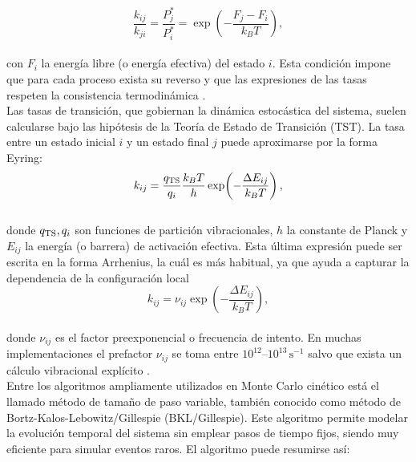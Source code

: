 \documentclass[12pt,letterpaper,oneside]{report}
\begin{document}
\begin{equation}
\frac{k_{ij}}{k_{ji}} = \frac{P_j^\ast}{P_i^\ast} = \exp\!\left(-\frac{F_j - F_i}{k_B T}\right),
\label{eq:detailed_balance}
\end{equation}\\

\noindent con \(F_i\) la energía libre (o energía efectiva) del estado \(i\). Esta condición impone que para cada proceso exista su reverso y que las expresiones de las tasas respeten la consistencia termodinámica \cite{Andersen2019}. \\

Las tasas de transición, que gobiernan la dinámica estocástica del sistema, suelen calcularse bajo las hipótesis de la Teoría de Estado de Transición (TST). La tasa entre un estado inicial \(i\) y un estado final \(j\) puede aproximarse por la forma Eyring:\\

\begin{equation}
k_{ij} = \frac{q_{\rm TS}}{q_i}\frac{k_B T}{h}\exp\!\left(-\frac{\Delta E_{ij}}{k_B T}\right),
\label{eq:tst}
\end{equation}\\

\noindent donde \(q_{\rm TS}, q_i\) son funciones de partición vibracionales, \(h\) la constante de Planck y $E_{ij}$ la energía (o barrera) de activación efectiva. Esta última expresión puede ser escrita en la forma Arrhenius, la cuál es más habitual, ya que ayuda a capturar la dependencia de la configuración local\\

\begin{equation}
k_{ij} =  \nu_{ij}\exp\!\left(-\frac{\Delta E_{ij}}{k_B T}\right),
\label{eq:Arr}
\end{equation}\\

\noindent donde $\nu_{ij}$ es el factor preexponencial o frecuencia de intento. En muchas implementaciones el prefactor \(\nu_{ij}\) se toma entre \(10^{12}\)–\(10^{13}\,\text{s}^{-1}\) salvo que exista un cálculo vibracional explícito \cite{Andersen2019}.\\

Entre los algoritmos ampliamente utilizados en Monte Carlo cinético está el llamado método de tamaño de paso variable, también conocido como método de Bortz-Kalos-Lebowitz/Gillespie  (BKL/Gillespie). Este algoritmo permite modelar la evolución
temporal del sistema sin emplear pasos de tiempo
fijos, siendo muy eficiente para simular eventos
raros. El algoritmo puede resumirse así:\\
\end{document}
